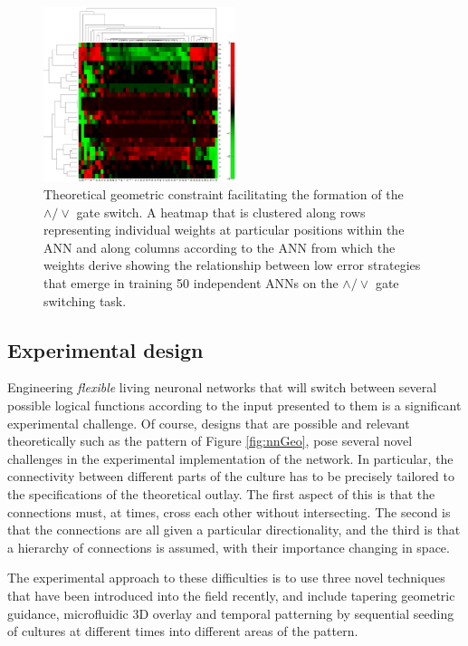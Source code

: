 \begin{figure}
\begin{center}
\includegraphics[width=0.5\textwidth]{../fig/dendrogram.pdf}
\end{center}
\caption{Theoretical geometric constraint facilitating the formation of the $\wedge / \vee$ gate switch. A heatmap that is clustered along rows representing individual weights at particular positions within the ANN and along columns according to the ANN from which the weights derive showing the relationship between low error strategies that emerge in training 50 independent ANNs on the $\wedge / \vee$ gate switching task.}\label{fig:nnDendro}
\end{figure}

\subsection{Experimental design}\label{sec:expdesign}
Engineering {\it flexible} living neuronal networks that will switch between several possible logical functions according to the input presented to them is a significant experimental challenge. Of course, designs that are possible and relevant theoretically such as the pattern of Figure \ref{fig:nnGeo}, pose several novel challenges in the experimental implementation of the network. In particular, the connectivity between different parts of the culture has to be precisely tailored to the specifications of the theoretical outlay. The first aspect of this is that the connections must, at times, cross each other without intersecting. The second is that the connections are all given a particular directionality, and the third is that a hierarchy of connections is assumed, with their importance changing in space.

The experimental approach to these difficulties is to use three novel techniques that have been introduced into the field recently, and include tapering geometric guidance, microfluidic 3D overlay and temporal patterning by sequential seeding of cultures at different times into different areas of the pattern.

